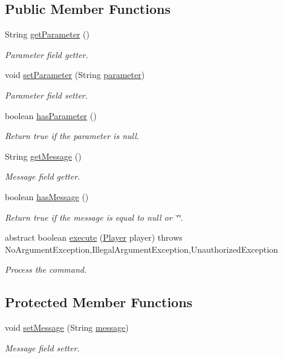\subsection*{Public Member Functions}
\begin{DoxyCompactItemize}
\item 
String \hyperlink{classCommand_a1ced3739d546770ba1389e6ce228255e}{get\-Parameter} ()
\begin{DoxyCompactList}\small\item\em Parameter field getter. \end{DoxyCompactList}\item 
void \hyperlink{classCommand_a1301a473bc2a80d40d6ee907c21a1475}{set\-Parameter} (String \hyperlink{classCommand_a02ad27e4576737c16cd78f708188bb54}{parameter})
\begin{DoxyCompactList}\small\item\em Parameter field setter. \end{DoxyCompactList}\item 
boolean \hyperlink{classCommand_a9b042558156d6749566e0fd9d48d3bfe}{has\-Parameter} ()
\begin{DoxyCompactList}\small\item\em Return true if the parameter is null. \end{DoxyCompactList}\item 
String \hyperlink{classCommand_ac3d4abebefb2aea0ce9757bf9c356882}{get\-Message} ()
\begin{DoxyCompactList}\small\item\em Message field getter. \end{DoxyCompactList}\item 
boolean \hyperlink{classCommand_a3d232d33894a20dc81b7627d84f14183}{has\-Message} ()
\begin{DoxyCompactList}\small\item\em Return true if the message is equal to null or \char`\"{}\char`\"{}. \end{DoxyCompactList}\item 
abstract boolean \hyperlink{classCommand_a8e57e3c92529fd3e7e6519fa454422b1}{execute} (\hyperlink{classPlayer}{Player} player)  throws No\-Argument\-Exception,\-Illegal\-Argument\-Exception,\-Unauthorized\-Exception
\begin{DoxyCompactList}\small\item\em Process the command. \end{DoxyCompactList}\end{DoxyCompactItemize}
\subsection*{Protected Member Functions}
\begin{DoxyCompactItemize}
\item 
void \hyperlink{classCommand_a715709d8f0ab65879d79ad1725c96f17}{set\-Message} (String \hyperlink{classCommand_a623fd9ca1e1b03cc35a667bc3e67bc78}{message})
\begin{DoxyCompactList}\small\item\em Message field setter. \end{DoxyCompactList}\end{DoxyCompactItemize}
